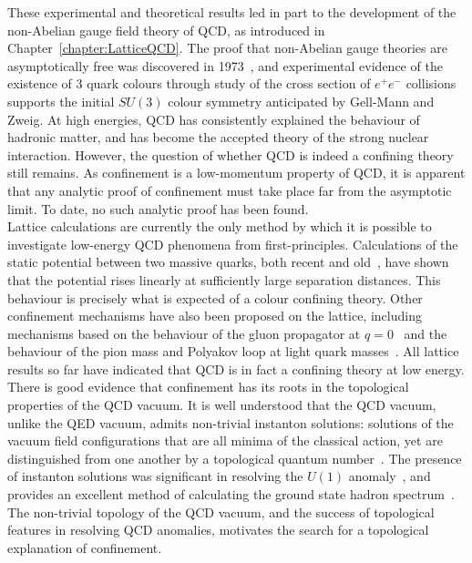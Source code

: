 These experimental and theoretical results led in part to the development of the non-Abelian gauge field theory of QCD, as introduced in Chapter~\ref{chapter:LatticeQCD}. The proof that non-Abelian gauge theories are asymptotically free was discovered in 1973~\cite{Gross:1973id}, and experimental evidence of the existence of 3 quark colours through study of the cross section of $e^+ e^-$ collisions supports the initial $SU(3)$ colour symmetry anticipated by Gell-Mann and Zweig. At high energies, QCD has consistently explained the behaviour of hadronic matter, and has become the accepted theory of the strong nuclear interaction. However, the question of whether QCD is indeed a confining theory still remains. As confinement is a low-momentum property of QCD, it is apparent that any analytic proof of confinement must take place far from the asymptotic limit. To date, no such analytic proof has been found.\\

Lattice calculations are currently the only method by which it is possible to investigate low-energy QCD phenomena from first-principles. Calculations of the static potential between two massive quarks, both recent and old~\cite{Born:1993cq, Bonnet:1999gt, Creutz:1980hb, DiGiacomo:1990hc}, have shown that the potential rises linearly at sufficiently large separation distances. This behaviour is precisely what is expected of a colour confining theory. Other confinement mechanisms have also been proposed on the lattice, including mechanisms based on the behaviour of the gluon propagator at $q=0$~\cite{Zwanziger:1991gz} and the behaviour of the pion mass and Polyakov loop at light quark masses~\cite{Iwasaki:1991mr}. All lattice results so far have indicated that QCD is in fact a confining theory at low energy.\\

There is good evidence that confinement has its roots in the topological properties of the QCD vacuum. It is well understood that the QCD vacuum, unlike the QED vacuum, admits non-trivial instanton solutions: solutions of the vacuum field configurations that are all minima of the classical action, yet are distinguished from one another by a topological quantum number~\cite{Belavin:1975fg}. The presence of instanton solutions was significant in resolving the $U(1)$ anomaly~\cite{tHooft:1986ooh}, and provides an excellent method of calculating the ground state hadron spectrum~\cite{Schafer:1996wv}. The non-trivial topology of the QCD vacuum, and the success of topological features in resolving QCD anomalies, motivates the search for a topological explanation of confinement. 

